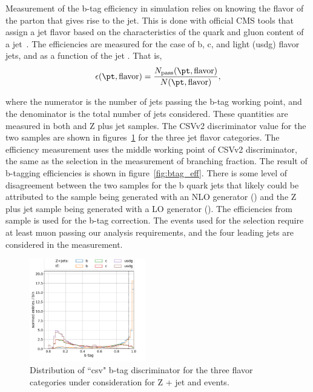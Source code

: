 Measurement of the b-tag efficiency in simulation relies on knowing the flavor of the parton that gives rise to the jet.  This is done with official CMS tools that assign a jet flavor based on the characteristics of the quark and gluon content of a jet~\cite{twiki:jet_mc_flavor}.  The efficiencies are measured for the case of b, c, and light (usdg) flavor jets, and as a function of the jet \pt.  That is,
\begin{equation}
    \epsilon(\pt, \mathrm{flavor}) = \frac{ N_{\mathrm{pass}}(\pt, \mathrm{flavor})} {N(\pt, \mathrm{flavor})},
\end{equation}

\noindent where the numerator is the number of jets passing the b-tag working point, and the denominator is the total number of jets considered. These quantities are measured in both \ttbar and Z plus jet samples. The CSVv2 discriminator value for the two samples are shown in figures~\ref{fig:btag_csvv2} for the three jet flavor categories. The efficiency measurement uses the middle working point of CSVv2 discriminator, the same as the selection in the measurement of \PW branching fraction. The result of b-tagging efficiencies is shown in figure~\ref{fig:btag_eff}.  There is some level of disagreement between the two samples for the b quark jets that likely could be attributed to the \ttbar sample being generated with an NLO generator (\POWHEG) and the Z plus jet sample being generated with a LO generator (\MADGRAPH). The efficiencies from \ttbar sample is used for the b-tag correction. The events used for the selection require at least muon passing our analysis requirements, and the four leading \pt jets are considered in the measurement.

\begin{figure}[h!]
    \centering
    \includegraphics[width=0.45\textwidth]{chapters/Appendix/sectionBtag/figures/bmva_mc.pdf}
    \caption{Distribution of ``csv" b-tag discriminator for the three flavor categories under consideration for Z + jet and \ttbar events.      
    \label{fig:btag_csvv2}}
\end{figure}

